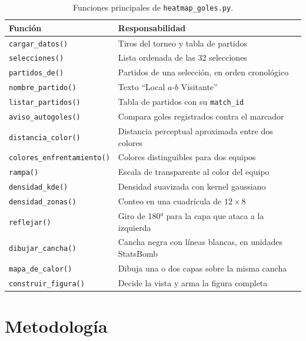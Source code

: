 \documentclass[11pt,a4paper]{article}
\begin{document}
\begin{table}[H]
\centering
\begin{tabular}{@{}ll@{}}
\toprule
Función & Responsabilidad \\
\midrule
\texttt{cargar\_datos()}            & Tiros del torneo y tabla de partidos \\
\texttt{selecciones()}              & Lista ordenada de las 32 selecciones \\
\texttt{partidos\_de()}             & Partidos de una selección, en orden cronológico \\
\texttt{nombre\_partido()}          & Texto ``Local $a$-$b$ Visitante'' \\
\texttt{listar\_partidos()}         & Tabla de partidos con su \texttt{match\_id} \\
\texttt{aviso\_autogoles()}         & Compara goles registrados contra el marcador \\
\texttt{distancia\_color()}         & Distancia perceptual aproximada entre dos colores \\
\texttt{colores\_enfrentamiento()}  & Colores distinguibles para dos equipos \\
\texttt{rampa()}                    & Escala de transparente al color del equipo \\
\texttt{densidad\_kde()}            & Densidad suavizada con kernel gaussiano \\
\texttt{densidad\_zonas()}          & Conteo en una cuadrícula de $12 \times 8$ \\
\texttt{reflejar()}                 & Giro de 180° para la capa que ataca a la izquierda \\
\texttt{dibujar\_cancha()}          & Cancha negra con líneas blancas, en unidades StatsBomb \\
\texttt{mapa\_de\_calor()}          & Dibuja una o dos capas sobre la misma cancha \\
\texttt{construir\_figura()}        & Decide la vista y arma la figura completa \\
\bottomrule
\end{tabular}
\caption{Funciones principales de \texttt{heatmap\_goles.py}.}
\end{table}

\section{Metodología}
\end{document}
